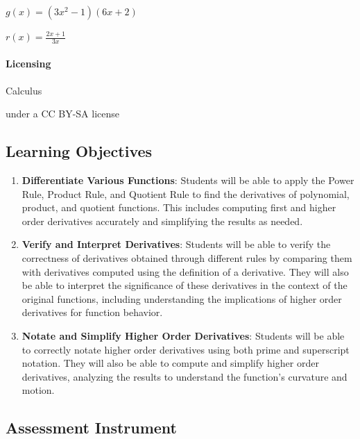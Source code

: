 {{{{$g(x) = (3x^2 - 1)(6x + 2)$



$r(x) = \frac {2x + 1}{3x}$



\paragraph{Licensing}



\begin{itemize}
    \item \href{https://en.wikibooks.org/wiki/High_School_Calculus/Techniques_of_Differentiation}{Techniques of Differentiation, Wikibooks: High School
\end{itemize}
    Calculus}

    under a CC BY-SA license

\subsection{Learning Objectives}

\begin{enumerate}
    \item \textbf{Differentiate Various Functions}: Students will be able to apply the Power Rule, Product Rule, and Quotient Rule to find the derivatives of polynomial, product, and quotient functions. This includes computing first and higher order derivatives accurately and simplifying the results as needed.
    \item \textbf{Verify and Interpret Derivatives}: Students will be able to verify the correctness of derivatives obtained through different rules by comparing them with derivatives computed using the definition of a derivative. They will also be able to interpret the significance of these derivatives in the context of the original functions, including understanding the implications of higher order derivatives for function behavior.
    \item \textbf{Notate and Simplify Higher Order Derivatives}: Students will be able to correctly notate higher order derivatives using both prime and superscript notation. They will also be able to compute and simplify higher order derivatives, analyzing the results to understand the function's curvature and motion.
\end{enumerate}

\subsection{Assessment Instrument}

}}}
